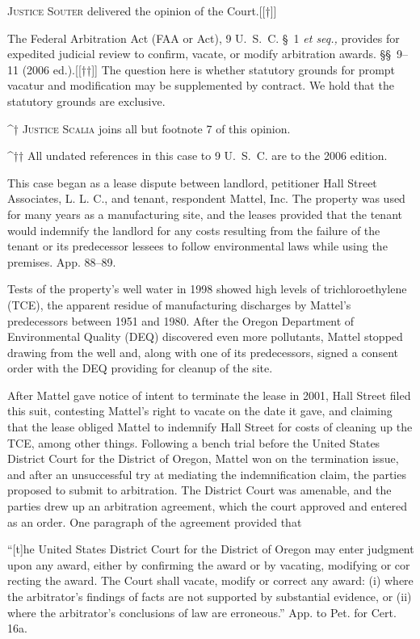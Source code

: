 
\setcounter{page}{578}

  \textsc{Justice Souter} delivered the opinion of the Court.[[†]]

  The Federal Arbitration Act (FAA or Act), 9 U.~S.~C. \S~1 \emph{et
seq.,} provides for expedited judicial review to confirm, vacate,
or modify arbitration awards. \S\S~9--11 (2006 ed.).[[††]] The
question here is whether statutory grounds for prompt vacatur and
modification may be supplemented by contract. We hold that the statutory
grounds are exclusive.\newpage 

^† \textsc{Justice Scalia} joins all but footnote 7 of this opinion.

^†† All undated references in this case to 9 U.~S.~C. are to the
2006 edition.

  This case began as a lease dispute between landlord, petitioner Hall
Street Associates, L. L. C., and tenant, respondent Mattel, Inc. The
property was used for many years as a manufacturing site, and the leases
provided that the tenant would indemnify the landlord for any costs
resulting from the failure of the tenant or its predecessor lessees to
follow environmental laws while using the premises. App. 88--89.

  Tests of the property's well water in 1998 showed high levels
of trichloroethylene (TCE), the apparent residue of manufacturing
discharges by Mattel's predecessors between 1951 and 1980. After the
Oregon Department of Environmental Quality (DEQ) discovered even more
pollutants, Mattel stopped drawing from the well and, along with one
of its predecessors, signed a consent order with the DEQ providing for
cleanup of the site.

  After Mattel gave notice of intent to terminate the lease in 2001,
Hall Street filed this suit, contesting Mattel's right to vacate
on the date it gave, and claiming that the lease obliged Mattel to
indemnify Hall Street for costs of cleaning up the TCE, among other
things. Following a bench trial before the United States District
Court for the District of Oregon, Mattel won on the termination issue,
and after an unsuccessful try at mediating the indemnification claim,
the parties proposed to submit to arbitration. The District Court was
amenable, and the parties drew up an arbitration agreement, which the
court approved and entered as an order. One paragraph of the agreement
provided that

    ``[t]he United States District Court for the District of Oregon
    may enter judgment upon any award, either by confirming the award
    or by vacating, modifying or cor recting the award. The Court shall
    vacate, modify or correct any award: (i) where the arbitrator's
    findings of facts are not supported by substantial evidence, or (ii)
    where the arbitrator's conclusions of law are erroneous.'' App.
    to Pet. for Cert. 16a.

